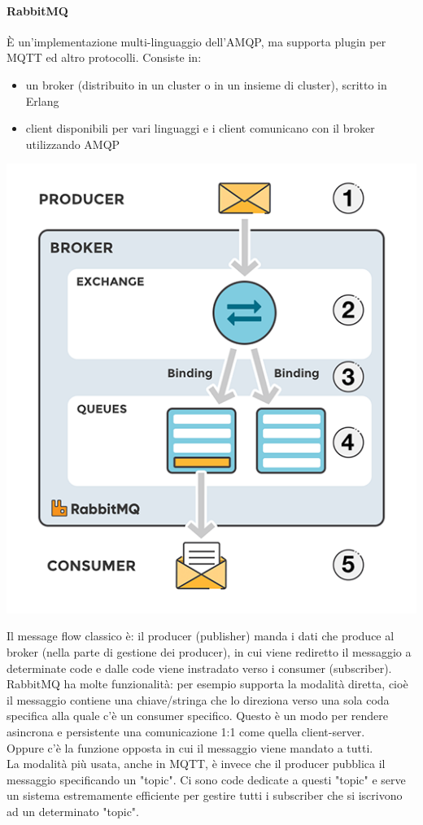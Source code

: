 \paragraph{RabbitMQ}
È un'implementazione multi-linguaggio dell'AMQP, ma supporta plugin per MQTT ed altro protocolli. Consiste in:
\begin{itemize}
    \item un broker (distribuito in un cluster o in un insieme di cluster), scritto in Erlang
    \item client disponibili per vari linguaggi e i client comunicano con il broker utilizzando AMQP
\end{itemize} 
\begin{center}
    \includegraphics[width = .5\textwidth]{images/lezione3/rabbitmq.png}
\end{center}
Il message flow classico è: il producer (publisher) manda i dati che produce al broker (nella parte di gestione dei producer), in cui viene rediretto il messaggio a determinate code e dalle code viene instradato verso i consumer (subscriber). \\
RabbitMQ ha molte funzionalità: per esempio supporta la modalità diretta, cioè il messaggio contiene una chiave/stringa che lo direziona verso una sola coda specifica alla quale c'è un consumer specifico. Questo è un modo per rendere asincrona e persistente una comunicazione 1:1 come quella client-server. \\
Oppure c'è la funzione opposta in cui il messaggio viene mandato a tutti. \\
La modalità più usata, anche in MQTT, è invece che il producer pubblica il messaggio specificando un "topic". Ci sono code dedicate a questi "topic" e serve un sistema estremamente efficiente per gestire tutti i subscriber che si iscrivono ad un determinato "topic". \\
